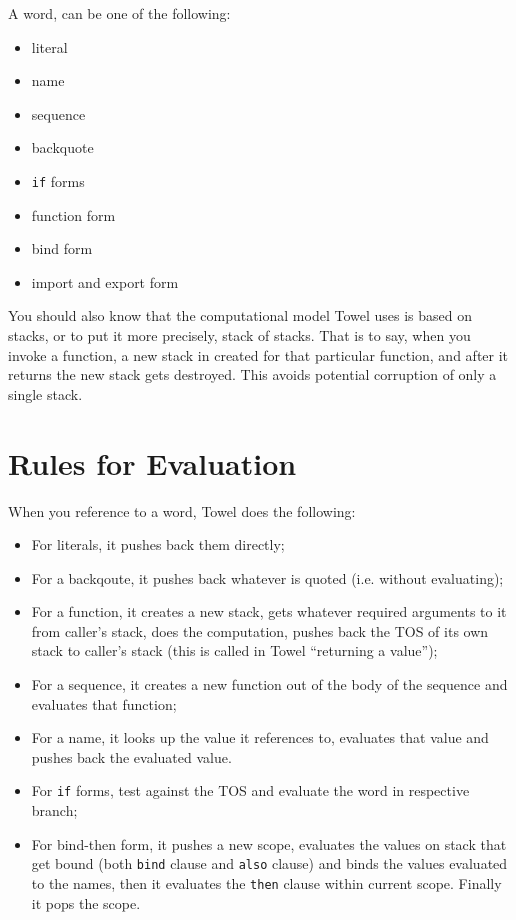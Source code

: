 \documentclass{report}
\begin{document}
A word, can be one of the following:
\begin{itemize}
\item literal
\item name
\item sequence
\item backquote
\item \texttt{if} forms
\item function form
\item bind form
\item import and export form
\end{itemize}

You should also know that the computational model Towel uses is based on stacks, or to put it more precisely, stack of stacks. That is to say, when you invoke a function, a new stack in created for that particular function, and after it returns the new stack gets destroyed. This avoids potential corruption of only a single stack.

\section{Rules for Evaluation}

When you reference to a word, Towel does the following:
\begin{itemize}
\item For literals, it pushes back them directly;
\item For a backqoute, it pushes back whatever is quoted (i.e. without evaluating);
\item For a function, it creates a new stack, gets whatever required arguments to it from caller's stack, does the computation, pushes back the TOS of its own stack to caller's stack (this is called in Towel ``returning a value'');
\item For a sequence, it creates a new function out of the body of the sequence and evaluates that function;
\item For a name, it looks up the value it references to, evaluates that value and pushes back the evaluated value.
\item For \texttt{if} forms, test against the TOS and evaluate the word in respective branch;
\item For bind-then form, it pushes a new scope, evaluates the values on stack that get bound (both \texttt{bind} clause and \texttt{also} clause) and binds the values evaluated to the names, then it evaluates the \texttt{then} clause within current scope. Finally it pops the scope.
\end{itemize}
\end{document}
